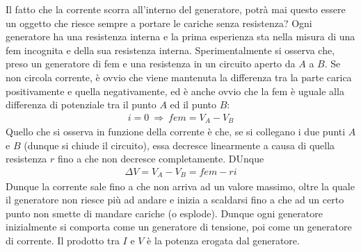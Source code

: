 \documentclass[a4paper, oneside]{article}
\begin{document}
Il fatto che la corrente scorra all'interno del generatore, potrà mai 
questo essere un oggetto che riesce sempre a portare le cariche 
senza resistenza? Ogni generatore ha una resistenza interna e la prima 
esperienza sta nella misura di una fem incognita e della sua resistenza 
interna. Sperimentalmente si osserva che, preso un generatore di fem e una resistenza
in un circuito aperto da $A$ a $B$. Se non circola corrente, è 
ovvio che viene mantenuta la differenza tra la parte carica positivamente e quella
negativamente, ed è anche ovvio che la fem è uguale alla differenza di potenziale tra 
il punto $A$ ed il punto $B$:
\begin{gather*}
    i = 0 \ \Longrightarrow \  fem = V_A - V_B
\end{gather*} 
Quello che si osserva in funzione della corrente è che, se si collegano 
i due punti $A$ e $B$ (dunque si chiude il circuito), essa decresce linearmente a causa di quella resistenza $r$ 
fino a che non decresce completamente. DUnque 
\begin{gather*}
    \Delta V = V_A - V_B = fem - ri
\end{gather*}
Dunque la corrente sale fino a che non arriva ad un valore massimo, oltre la quale il 
generatore non riesce più ad andare e inizia a scaldarsi fino a che ad un certo punto
non smette di mandare cariche (o esplode). Dunque ogni generatore inizialmente si comporta 
come un generatore di tensione, poi come un generatore di corrente. Il prodotto tra $I$ e $V$ è 
la potenza erogata dal generatore. 
\end{document}
